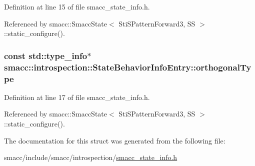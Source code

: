 Definition at line 15 of file smacc\+\_\+state\+\_\+info.\+h.



Referenced by smacc\+::\+Smacc\+State$<$ Sti\+S\+Pattern\+Forward3, S\+S $>$\+::static\+\_\+configure().

\subsubsection[{\texorpdfstring{orthogonal\+Type}{orthogonalType}}]{\setlength{\rightskip}{0pt plus 5cm}const std\+::type\+\_\+info$\ast$ smacc\+::introspection\+::\+State\+Behavior\+Info\+Entry\+::orthogonal\+Type}\hypertarget{structsmacc_1_1introspection_1_1StateBehaviorInfoEntry_aafb02bbfd8a479d586039b3971dfe7e0}{}\label{structsmacc_1_1introspection_1_1StateBehaviorInfoEntry_aafb02bbfd8a479d586039b3971dfe7e0}


Definition at line 17 of file smacc\+\_\+state\+\_\+info.\+h.



Referenced by smacc\+::\+Smacc\+State$<$ Sti\+S\+Pattern\+Forward3, S\+S $>$\+::static\+\_\+configure().



The documentation for this struct was generated from the following file\+:\begin{DoxyCompactItemize}
\item 
smacc/include/smacc/introspection/\hyperlink{smacc__state__info_8h}{smacc\+\_\+state\+\_\+info.\+h}\end{DoxyCompactItemize}
